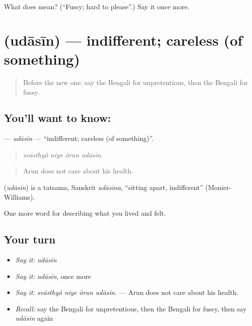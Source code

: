 \begin{tcolorbox}[breakable,colback=teal!4,colframe=teal!35!black,title={Before you move on}]
What does  mean? (\textquotedblleft{}Fussy; hard to please\textquotedblright{}.) Say it once more.
\end{tcolorbox}
\section[\texorpdfstring{\bn{উদাসীন} (udāsīn)}{উদাসীন (udāsīn)}]{ (udāsīn) — indifferent; careless (of something)}

\label{lesson:BN-C464-udasin}



\begin{quote}
Before the new one: say the Bengali for unpretentious, then the Bengali for fussy.
\end{quote}

\subsection*{You'll want to know: }
\textbf{} — \emph{udāsīn} — \textquotedblleft{}indifferent; careless (of something)\textquotedblright{}.

\begin{quote}
   
\end{quote}

\begin{quote}
\emph{svāsthyô niye ôrun udāsīn.}
\end{quote}

\begin{quote}
Arun does not care about his health.
\end{quote}

\begin{cousinweb}
\textbf{} (\emph{udāsīn}) is a tatsama, Sanskrit \emph{udāsīna}, \textquotedblleft{}sitting apart, indifferent\textquotedblright{} (Monier-Williams).
\end{cousinweb}

\begin{grammarlens}[title={What you've built}]
One more word for describing what you lived and felt.
\end{grammarlens}

\subsection*{Your turn}
\begin{itemize}
\raggedright
  \item \emph{Say it:} \emph{udāsīn}
  \item \emph{Say it:} \emph{udāsīn}, once more
  \item \emph{Say it:} \emph{svāsthyô niye ôrun udāsīn.} — Arun does not care about his health.
  \item \emph{Recall:} say the Bengali for unpretentious, then the Bengali for fussy, then say \emph{udāsīn} again
\end{itemize}

